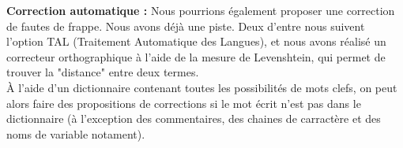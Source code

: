 \documentclass[a4paper,12pt]{article}
\begin{document}
		\textbf{Correction automatique :}
		Nous pourrions également proposer une correction de fautes de frappe. Nous avons déjà une piste. Deux d'entre nous suivent l'option TAL (Traitement Automatique des Langues), et nous avons réalisé un correcteur orthographique à l'aide de la mesure de Levenshtein, qui permet de trouver la "distance" entre deux termes. \\
		À l'aide d'un dictionnaire contenant toutes les possibilités de mots clefs, on peut alors faire des propositions de corrections si le mot écrit n'est pas dans le dictionnaire (à l'exception des commentaires, des chaines de carractère et des noms de variable notament).
\end{document}
